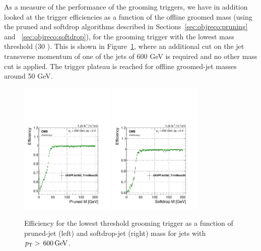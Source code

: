 As a measure of the performance of the grooming triggers, we have in addition looked at the trigger efficiencies as a function of the offline groomed mass (using the pruned and softdrop algorithms described in Sections~\ref{sec:objreco:pruning} and ~\ref{sec:objreco:softdrop}), for the grooming trigger with the lowest mass threshold (30 \GeV). This is shown in Figure~\ref{fig:searchI:grooming-mj-trigger}, where an additional cut on the jet transverse momentum of one of the jets of 600 GeV is required and no other mass cut is applied. The trigger plateau is reached for offline groomed-jet masses around 50 GeV. 
\begin{figure}[h!]
\centering
\includegraphics[width=0.4\textwidth]{figures/analysis/search1/AN-15-211//triggereff-prunedmass600.pdf}
\includegraphics[width=0.4\textwidth]{figures/analysis/search1/AN-15-211//triggereff-sdmass.pdf}
\caption{Efficiency for the lowest threshold grooming trigger as a function of pruned-jet (left) and softdrop-jet (right) mass for jets with $p_{\mathrm{T}} > \text{\,600}{\ensuremath{\,\text{Ge\hspace{-.08em}V}}}$.}
\label{fig:searchI:grooming-mj-trigger}
\end{figure}

